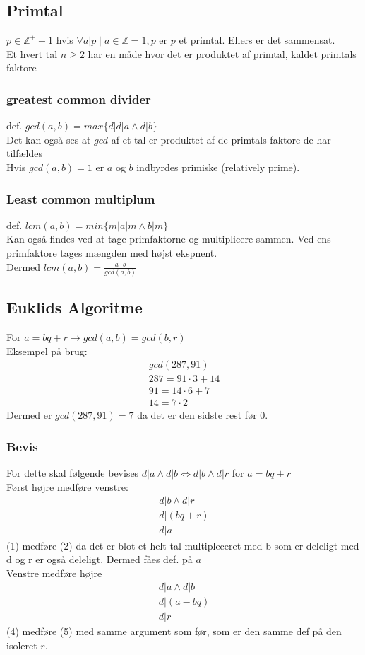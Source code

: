 \documentclass[12pt, a4paper]{article}
\begin{document}
			\subsection{Primtal}
				$p\in \mathbb{Z}^+-{1}$ hvis $\forall a|p \;|\; a\in \mathbb{Z} = {1,p}$ er $p$ et primtal. Ellers er det sammensat.\\
				Et hvert tal $n\geq 2$ har en måde hvor det er produktet af primtal, kaldet primtals faktore\\
			\subsubsection{greatest common divider}
				def. $gcd(a,b)=max\{d| d|a \land d|b\}$\\
				Det kan også ses at $gcd$ af et tal er produktet af de primtals faktore de har tilfældes\\
				Hvis $gcd(a,b)=1$ er $a$ og $b$ indbyrdes primiske (relatively prime).
			\subsubsection{Least common multiplum}
				def. $lcm(a,b)=min\{m| a|m \land b|m\}$\\
				Kan også findes ved at tage primfaktorne og multiplicere sammen. Ved ens primfaktore tages mængden med højst ekspnent.\\
				Dermed $lcm(a,b)=\frac{a\cdot b}{gcd(a,b)}$
		\subsection{Euklids Algoritme}
			For $a=bq+r \rightarrow gcd(a,b)=gcd(b,r)$\\
			Eksempel på brug:
			\begin{align*}
				gcd(287,91)\\
				287=91\cdot 3 + 14\\
				91=14\cdot 6 + 7\\
				14=7\cdot 2
			\end{align*}
			Dermed er $gcd(287,91)=7$ da det er den sidste rest før 0.
			\subsubsection{Bevis}
				For dette skal følgende bevises $d|a\land d|b \iff d|b\land d|r$ for $a=bq+r$\\
				Først højre medføre venstre:
				\begin{align}
					d|b\land d|r\\
					d|(bq+r)\\
					d|a
				\end{align}
				(1) medføre (2) da det er blot et helt tal multipleceret med b som er deleligt med d og r er også deleligt. Dermed fåes def. på $a$\\
				Venstre medføre højre\\
				\begin{align}
					d|a \land d|b\\
					d|(a-bq)\\
					d|r
				\end{align}
				(4) medføre (5) med samme argument som før, som er den samme def på den isoleret $r$.
\end{document}
